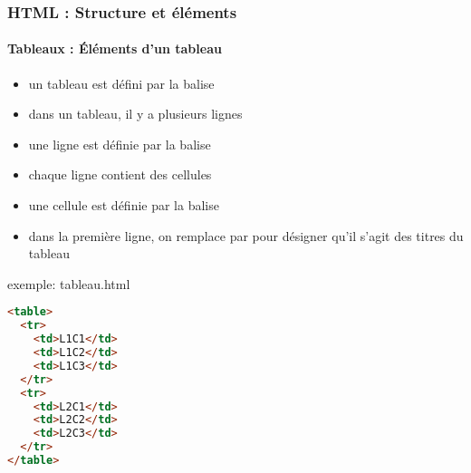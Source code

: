 \documentclass[xcolor=table]{beamer}
\begin{document}
\begin{frame}[fragile]
\frametitle{HTML : Structure et éléments}
\framesubtitle{Tableaux : Éléments d'un tableau}

\begin{minipage}{0.60\textwidth} 
	\begin{itemize}
		\item un tableau est défini par la balise 
		\item dans un tableau, il y a plusieurs lignes
		\item une ligne est définie par la balise 
		\item chaque ligne contient des cellules
		\item une cellule est définie par la balise 
		\item dans la première ligne, on remplace  par  pour désigner qu'il s'agit des titres du tableau
	\end{itemize}
\end{minipage}
%
\begin{minipage}{0.39\textwidth}
\begin{exampleblock}{exemple: tableau.html}
\lstset{escapeinside=**}
\scriptsize\bfseries
\begin{lstlisting}[language={html}]
<table>
  <tr>
    <td>L1C1</td>
    <td>L1C2</td>
    <td>L1C3</td>
  </tr>
  <tr>
    <td>L2C1</td>
    <td>L2C2</td>
    <td>L2C3</td>
  </tr>
</table>
\end{lstlisting}
\end{exampleblock}
\end{minipage}

\end{frame}
\end{document}
